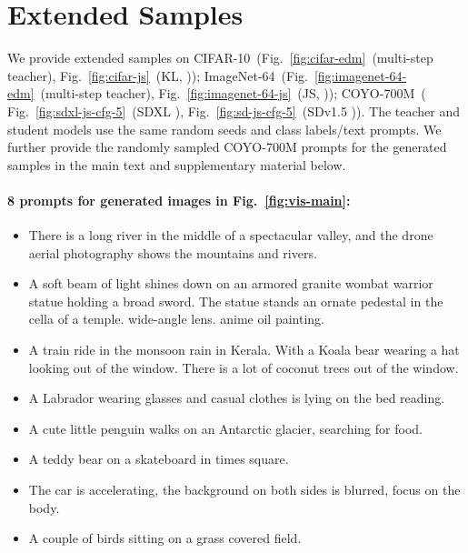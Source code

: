 \vspace{-2pt}
\section{Extended Samples}
\vspace{-2pt}
\label{app:extended}



We provide extended samples on CIFAR-10~(Fig.~\ref{fig:cifar-edm}~(multi-step teacher), Fig.~\ref{fig:cifar-js}~(KL, \method)); ImageNet-64~(Fig.~\ref{fig:imagenet-64-edm}~(multi-step teacher), Fig.~\ref{fig:imagenet-64-js}~(JS, \method)); COYO-700M~( Fig.~\ref{fig:sdxl-js-cfg-5}~(SDXL \method), Fig.~\ref{fig:sd-js-cfg-5}~(SDv1.5 \method)). The teacher and student models use the same random seeds and class labels/text prompts. We further provide the randomly sampled COYO-700M prompts for the generated samples in the main text and supplementary material below.
\vspace{-5pt}
\paragraph{8 prompts for generated images in Fig.~\ref{fig:vis-main}:}
\begin{itemize}
    \item There is a long river in the middle of a spectacular valley, and the drone aerial photography shows the mountains and rivers.
    \item A soft beam of light shines down on an armored granite wombat warrior statue holding a broad sword. The statue stands an ornate pedestal in the cella of a temple. wide-angle lens. anime oil painting.
    \item A train ride in the monsoon rain in Kerala. With a Koala bear wearing a hat looking out of the window. There is a lot of coconut trees out of the window.
    \item A Labrador wearing glasses and casual clothes is lying on the bed reading.
    \item A cute little penguin walks on an Antarctic glacier, searching for food.
    \item A teddy bear on a skateboard in times square.
    \item The car is accelerating, the background on both sides is blurred, focus on the body.
    \item A couple of birds sitting on a grass covered field.
\end{itemize}
\vspace{-5pt}
